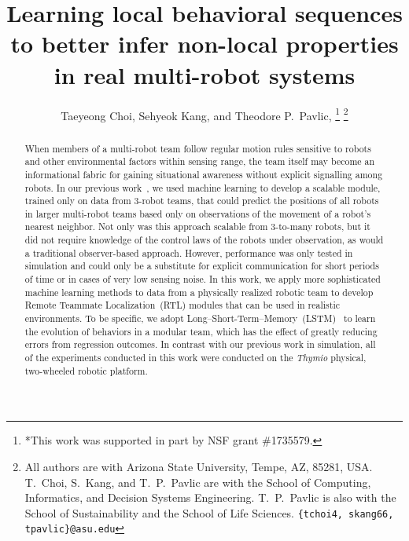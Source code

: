 \documentclass[letterpaper, 10 pt, conference]{ieeeconf}  %
\title{\LARGE \bf
	Learning local behavioral sequences
	to better infer non-local properties in real multi-robot systems
}
\author{Taeyeong Choi, Sehyeok Kang, and Theodore P.~Pavlic, \IEEEmembership{Member, IEEE} %
    \thanks{*This work was supported in part by NSF grant \#1735579.}%
    \thanks{All authors are with Arizona State University, Tempe, AZ,
        85281, USA. T.~Choi, S.~Kang, and T.~P.~Pavlic are with the
        School of Computing, Informatics, and Decision Systems
        Engineering. T.~P.~Pavlic is also with the School of
        Sustainability and the School of Life Sciences.
        {\tt\small \{tchoi4, skang66, tpavlic\}@asu.edu}}%
}
\begin{document}
	\maketitle
	\thispagestyle{empty}
	\pagestyle{empty}


	\begin{abstract}
        When members of a multi-robot team follow regular motion
        rules sensitive to robots and other environmental factors
        within sensing range, the team itself may become an
        informational fabric for gaining situational awareness without
        explicit signalling among robots. In our previous
        work~\cite{CPR17}, we used machine learning
        to develop a scalable module, trained only on data from
        3-robot teams, that could predict the positions of all
        robots in larger multi-robot teams based only on observations of the
        movement of a robot's nearest neighbor. Not only was this
        approach scalable from 3-to-many robots, but it did not require
        knowledge of the control laws of the robots under observation,
        as would a traditional observer-based approach.
        However, performance was only tested in
        simulation and could only be a substitute for explicit
        communication for short periods of time or in cases of very low
        sensing noise. In this work, we apply more sophisticated machine
        learning methods to data from a physically realized robotic team to
        develop Remote Teammate Localization~(RTL) modules that can be
        used in realistic environments. To be specific, we adopt
        Long--Short-Term--Memory~(LSTM)~\cite{HS97} to learn the
        evolution of behaviors in a modular team, which has the effect
        of greatly reducing errors from regression outcomes. In contrast
        with our previous work in simulation, all of the experiments
        conducted in this work were conducted on the \emph{Thymio}
        physical, two-wheeled robotic platform.

\end{abstract}
\end{document}
